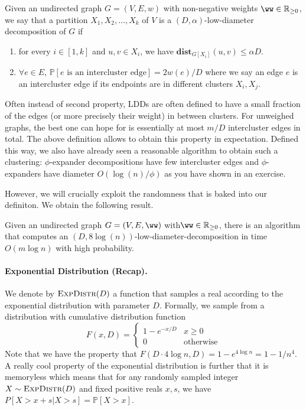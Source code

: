 \begin{definition}
Given an undirected graph $G = (V,E,w)$ with non-negative weights $\ww \in \mathbb{R}_{\geq 0}$, we say that a partition $X_1, X_2, \ldots, X_k$ of $V$ is a $(D, \alpha)$-low-diameter decomposition of $G$ if
\begin{enumerate}
\item  for every $i \in [1, k]$ and $u,v \in X_i$, we have $\mathbf{dist}_{G[X_i]}(u,v) \leq \alpha D$. 
\item $\forall e \in E$, $\mathbb{P}[e \text{ is an intercluster edge}] = 2w(e)/ D$ where we say an edge $e$ is an intercluster edge if its endpoints are in different clusters $X_i, X_j$. 
\end{enumerate}
\end{definition}
\begin{remark}
Often instead of second property, LDDs are often defined to have a small fraction of the edges (or more precisely their weight) in between clusters. For unweighed graphs, the best one can hope for is essentially at most $m/D$ intercluster edges in total.  The above definition allows to obtain this property in expectation. Defined this way, we also have already seen a reasonable algorithm to obtain such a clustering: $\phi$-expander decompositions have few intercluster edges and $\phi$-expanders have diameter $O(\log(n)/\phi)$ as you have shown in an exercise.
\end{remark}

However, we will crucially exploit the randomness that is baked into our definiton. We obtain the following result.

\begin{theorem}
Given an undirected graph $G = (V,E,\ww)$ with$\ww \in \mathbb{R}_{\geq 0}$, there is an algorithm that computes an $(D,  8 \log(n))$-low-diameter-decomposition in time $O(m \log n)$ with high probability. 
\end{theorem}

\paragraph{Exponential Distribution (Recap).} We denote by $\textsc{ExpDistr}(D)$ a function that samples a real according to the exponential distribution with parameter $D$.  Formally, we sample from a distribution with cumulative distribution function
\[
	F(x, D) = \begin{cases} 1 - e^{-x/D} & x \geq 0 \\ 0 & \text{otherwise} \end{cases}
\]
Note that we have the property that $F(D \cdot 4\log n,  D) = 1 - e^{4\log n} = 1-1/n^4$.  A really cool property of the exponential distribution is further that it is memoryless which means that for any randomly sampled integer $X \sim \textsc{ExpDistr}(D)$ and fixed positive reals $x,s$, we have $P[X > x + s | X > s] = \mathbb{P}[X > x]$.

